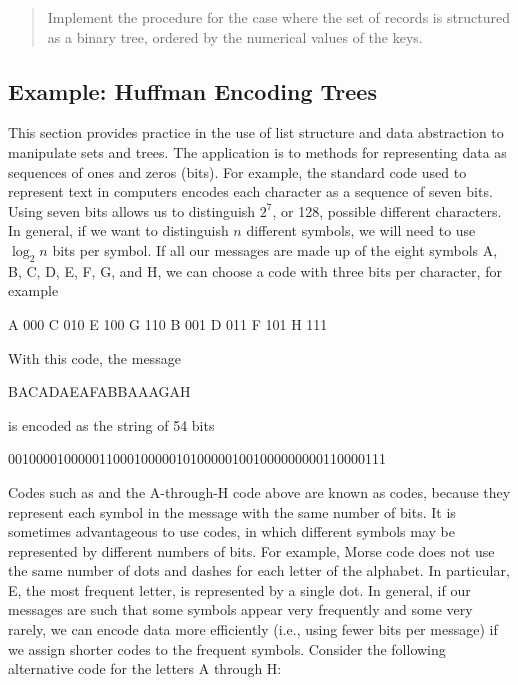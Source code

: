 \begin{quote}
 Implement the 
procedure for the case where the set of records is structured as a binary tree,
ordered by the numerical values of the keys.
\end{quote}

\subsection{Example: Huffman Encoding Trees}
\label{Section 2.3.4}

This section provides practice in the use of list structure and data
abstraction to manipulate sets and trees.  The application is to methods for
representing data as sequences of ones and zeros (bits).  For example, the
 standard code used to represent text in computers encodes each character
as a sequence of seven bits.  Using seven bits allows us to distinguish \( 2^7 \),
or 128, possible different characters.  In general, if we want to distinguish
\( n \) different symbols, we will need to use \( \log_2\!n \) bits per
symbol.  If all our messages are made up of the eight symbols A, B, C, D, E, F,
G, and H, we can choose a code with three bits per character, for example

\begin{example}
A 000    C 010    E 100    G 110
B 001    D 011    F 101    H 111
\end{example}

\noindent
With this code, the message

\begin{example}
BACADAEAFABBAAAGAH
\end{example}

\noindent
is encoded as the string of 54 bits

\begin{example}
001000010000011000100000101000001001000000000110000111
\end{example}

\noindent
Codes such as  and the A-through-H code above are known as
 codes, because they represent each symbol in the message
with the same number of bits.  It is sometimes advantageous to use
 codes, in which different symbols may be represented
by different numbers of bits.  For example, Morse code does not use the same
number of dots and dashes for each letter of the alphabet.  In particular, E,
the most frequent letter, is represented by a single dot.  In general, if our
messages are such that some symbols appear very frequently and some very
rarely, we can encode data more efficiently (i.e., using fewer bits per
message) if we assign shorter codes to the frequent symbols.  Consider the
following alternative code for the letters A through H:

